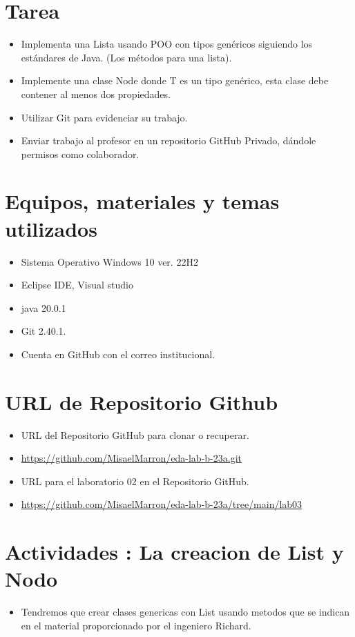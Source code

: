 \documentclass{article}
\begin{document}
	\section{Tarea}
	\begin{itemize}		
		\item Implementa una Lista usando POO con tipos genéricos siguiendo los estándares de Java. (Los métodos para una lista).
		\item Implemente una clase Node donde T es un tipo genérico, esta clase debe contener al menos dos propiedades.
		\item Utilizar Git para evidenciar su trabajo.
		\item Enviar trabajo al profesor en un repositorio GitHub Privado, dándole permisos como colaborador.
	\end{itemize}
		
	\section{Equipos, materiales y temas utilizados}
	\begin{itemize}
		\item Sistema Operativo Windows 10  ver. 22H2
		\item Eclipse IDE, Visual studio
		\item java 20.0.1
		\item Git 2.40.1.
		\item Cuenta en GitHub con el correo institucional.	
	\end{itemize}
	
	\section{URL de Repositorio Github}
	\begin{itemize}
		\item URL del Repositorio GitHub para clonar o recuperar.
		\item \url{https://github.com/MisaelMarron/eda-lab-b-23a.git}
		\item URL para el laboratorio 02 en el Repositorio GitHub.
		\item \url{https://github.com/MisaelMarron/eda-lab-b-23a/tree/main/lab03}
	\end{itemize}
	
	\clearpage
	\section{Actividades  : La creacion de List y Nodo}
	\begin{itemize}
		\item Tendremos que crear clases genericas con List usando metodos que se indican en el material proporcionado por el ingeniero Richard.     
		
	\end{itemize}
	
\end{document}
